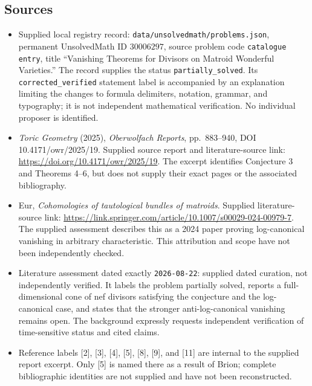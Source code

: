 \documentclass[11pt]{article}
\begin{document}
\subsection{Sources}
\begin{itemize}
\item Supplied local registry record: \texttt{data/unsolvedmath/problems.json}, permanent UnsolvedMath ID \(30006297\), source problem code \texttt{catalogue entry}, title ``Vanishing Theorems for Divisors on Matroid Wonderful Varieties.'' The record supplies the status \texttt{partially\_solved}. Its \texttt{corrected\_verified} statement label is accompanied by an explanation limiting the changes to formula delimiters, notation, grammar, and typography; it is not independent mathematical verification. No individual proposer is identified.
\item \emph{Toric Geometry} (2025), \emph{Oberwolfach Reports}, pp.\ 883--940, DOI 10.4171/owr/2025/19. Supplied source report and literature-source link: \url{https://doi.org/10.4171/owr/2025/19}. The excerpt identifies Conjecture 3 and Theorems 4--6, but does not supply their exact pages or the associated bibliography.
\item Eur, \emph{Cohomologies of tautological bundles of matroids}. Supplied literature-source link: \url{https://link.springer.com/article/10.1007/s00029-024-00979-7}. The supplied assessment describes this as a 2024 paper proving log-canonical vanishing in arbitrary characteristic. This attribution and scope have not been independently checked.
\item Literature assessment dated exactly \texttt{2026-08-22}: supplied dated curation, not independently verified. It labels the problem partially solved, reports a full-dimensional cone of nef divisors satisfying the conjecture and the log-canonical case, and states that the stronger anti-log-canonical vanishing remains open. The background expressly requests independent verification of time-sensitive status and cited claims.
\item Reference labels [2], [3], [4], [5], [8], [9], and [11] are internal to the supplied report excerpt. Only [5] is named there as a result of Brion; complete bibliographic identities are not supplied and have not been reconstructed.
\end{itemize}
\end{document}
